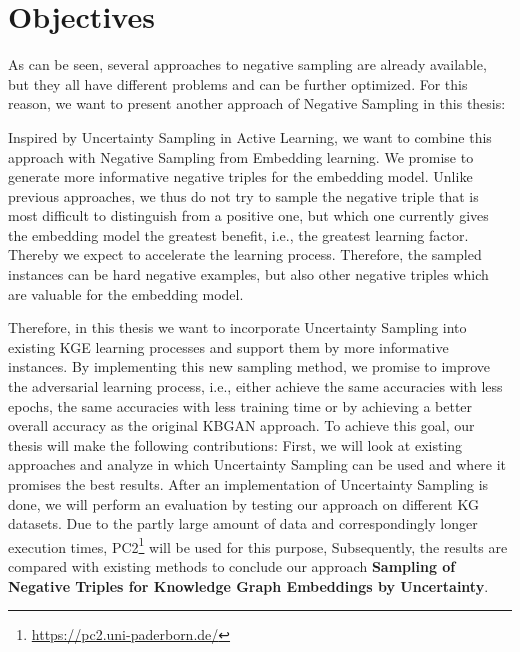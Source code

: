 \section{Objectives}
\label{sec:objectives}

As can be seen, several approaches to negative sampling are already available, but they all have different problems and can be further optimized.
For this reason, we want to present another approach of Negative Sampling in this thesis:

Inspired by Uncertainty Sampling in Active Learning, we want to combine this approach with Negative Sampling from Embedding learning.
We promise to generate more informative negative triples for the embedding model.
Unlike previous approaches, we thus do not try to sample the negative triple that is most difficult to distinguish from a positive one, but which one currently gives the embedding model the greatest benefit, i.e., the greatest learning factor.
Thereby we expect to accelerate the learning process.
Therefore, the sampled instances can be hard negative examples, but also other negative triples which are valuable for the embedding model.

Therefore, in this thesis we want to incorporate Uncertainty Sampling into existing KGE learning processes and support them by more informative instances.
By implementing this new sampling method, we promise to improve the adversarial learning process, i.e., either achieve the same accuracies with less epochs, the same accuracies with less training time or by achieving a better overall accuracy as the original \ac{KBGAN} approach.
To achieve this goal, our thesis will make the following contributions:
First, we will look at existing approaches and analyze in which Uncertainty Sampling can be used and where it promises the best results. 
After an implementation of Uncertainty Sampling is done, 
we will perform an evaluation by testing our approach on different \ac{KG} datasets.
Due to the partly large amount of data and correspondingly longer execution times, \ac{PC2}\footnote{\url{https://pc2.uni-paderborn.de/}} will be used for this purpose,
Subsequently, the results are compared with existing methods to conclude our approach \textbf{Sampling of Negative Triples for Knowledge Graph Embeddings by Uncertainty}.

 


